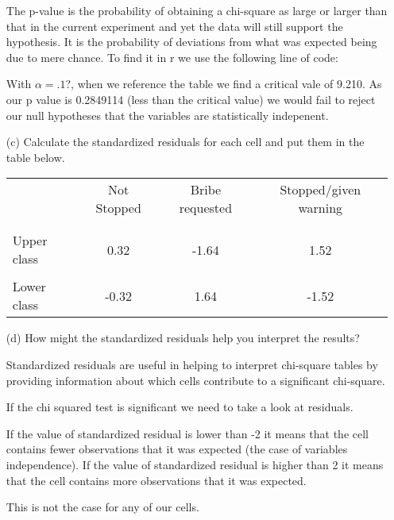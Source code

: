 \documentclass[12pt,letterpaper]{article}
\begin{document}
\begin{enumerate}
		The p-value is the probability of obtaining a chi-square as large or larger than that in the current experiment and yet the data will still support the hypothesis. It is the probability of deviations from what was expected being due to mere chance.	To find it in r we use the following line of code: 
		\vspace{0.25cm}
		  
		\vspace{0.25cm}
		With $\alpha = .1$?, when we reference the table we find a critical vale of 9.210. 
		As our p value is 0.2849114 (less than the critical value) we would fail to reject our null hypotheses that the variables are statistically indepenent.
		

		
		\newpage
		\item [(c)] Calculate the standardized residuals for each cell and put them in the table below.
		\vspace{1cm}
		  
		\vspace*{1cm}
		\begin{table}[h]
			\centering
			\begin{tabular}{l | c c c }
				& Not Stopped & Bribe requested & Stopped/given warning \\
				\\[-1.8ex] 
				\hline \\[-1.8ex]
				Upper class & 0.32 & -1.64 &  1.52 \\
				\\
				Lower class & -0.32 &  1.64 & -1.52  \\
				
			\end{tabular}
		\end{table}
		
		
		\vspace{5cm}
		\item [(d)] How might the standardized residuals help you interpret the results?  \vspace{1cm}
		
		Standardized residuals are useful in helping to interpret chi-square tables by providing information about which cells contribute to a significant chi-square.
		
		If the chi squared test is significant we need to take a look at residuals.
		
		If the value of standardized residual is lower than -2 it means that the cell contains fewer observations that it was expected (the case of variables independence). If the value of standardized residual is higher than 2 it means that the cell contains more observations that it was expected.
		
		This is not the case for any of our cells. 
	
		
		
	\end{enumerate}
	\newpage
	
\end{document}
